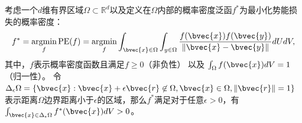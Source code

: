 \begin{theorem}[决策边界的表征分布非零]
\label{thm:peloss:border-distribution}
    考虑一个$d$维有界区域$\Omega \subset \mathbb R^d$以及定义在$\Omega$内部的概率密度泛函$f^*$为最小化势能损失的概率密度：
    \begin{equation}
        \label{eq:peloss:potential-min}
        f^* = \mathop\textnormal{argmin}_f \textnormal{PE}(f) = \mathop\textnormal{argmin}_{f} \int_{\bvec{x} \in \Omega} \int_{y \in \Omega} \dfrac{f(\bvec{x})f(\bvec{y})}{\Vert \bvec{x} - \bvec{y} \Vert} dUdV,
    \end{equation}
    其中，$f$表示概率密度函数且满足$f \ge 0$（非负性） 以及 $\int_{\Omega} f(\bvec{x})dV = 1$（归一性）。
    令$\Delta_\epsilon \Omega = \{\bvec{x}: \bvec{x} + \epsilon \bvec{r} \not\in \Omega, \bvec{x} \in \Omega, \Vert \bvec{r} \Vert = 1 \}$ 表示距离$\Omega$边界距离小于$\epsilon$的区域，那么$f^*$满足对于任意$\epsilon > 0$，有$\int_{\bvec{x}\in\Delta_\epsilon \Omega} f^*(\bvec{x})dV > 0$。
\end{theorem}
